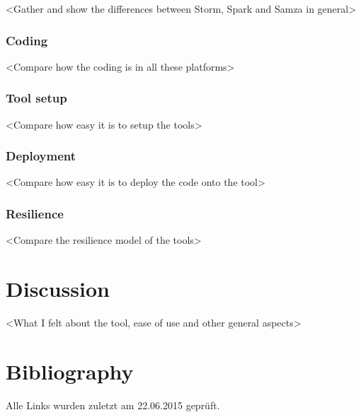 \documentclass[runningheads,a4paper]{llncs}[2015/06/24]
\begin{document}
 <Gather and show the differences between Storm, Spark and Samza in general>
 
 \subsubsection{Coding}
 <Compare how the coding is in all these platforms>
 
 \subsubsection{Tool setup}
 <Compare how easy it is to setup the tools>
 
 \subsubsection{Deployment}
 <Compare how easy it is to deploy the code onto the tool>
 
 \subsubsection{Resilience}
 <Compare the resilience model of the tools>
 
 \section{Discussion}
<What I felt about the tool, ease of use and other general aspects>



\section{Bibliography}


Alle Links wurden zuletzt am 22.06.2015 geprüft.
\end{document}
